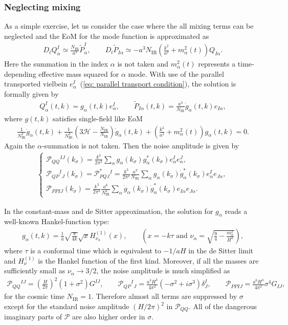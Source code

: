 \documentclass[a4paper,11pt]{article}
\newcommand{\IR}{\text{IR}}
\newcommand{\dps}{\displaystyle}
\newcommand{\calH}{\mathcal{H}}
\newcommand{\calP}{\mathcal{P}}
\newcommand{\bae}[1]{\begin{align} #1 \end{align}}
\newcommand{\bce}[1]{\begin{cases} #1 \end{cases}}
\begin{document}
\subsubsection{Neglecting mixing}

As a simple exercise, let us consider the case where the all mixing terms can be neglected and the EoM for the mode function is approximated as
\bae{
	D_tQ^I_\alpha\simeq\frac{N_\IR}{a^3}\tilde{P}^I_\alpha, \quad\quad 
	D_t\tilde{P}_{I\alpha}\simeq-a^3N_\IR\left(\frac{k^2}{a^2}+m_\alpha^2(t)\right)Q_{I\alpha}.
}
Here the summation in the index $\alpha$ is not taken and $m_\alpha^2(t)$ represents a time-depending effective mass squared 
for $\alpha$ mode. With use of the parallel transported vielbein $e^I_\alpha$~(\ref{eq: parallel transport condition}), 
the solution is formally given by
\bae{
	Q^I_\alpha(t,k)=g_\alpha(t,k)e^I_\alpha, \quad\quad \tilde{P}_{I\alpha}(t,k)=\frac{a^3}{N_\IR}\dot{g}_\alpha(t,k)e_{I\alpha},
}
where $g(t,k)$ satisfies single-field like EoM
\bae{
	\frac{1}{N_\IR^2}\ddot{g}_\alpha(t,k)+\frac{1}{N_\IR^2}\left(3\calH-\frac{\dot{N}_\IR}{N_\IR}\right)\dot{g}_\alpha(t,k)
	+\left(\frac{k^2}{a^2}+m^2_\alpha(t)\right)g_\alpha(t,k)=0.
}
Again the $\alpha$-summation is not taken. Then the noise amplitude is given by
\bae{
	\bce{
		\dps
		\calP_{QQ}{}^{IJ}(k_\sigma)=\frac{k^3}{2\pi^2}\sum_\alpha g_\alpha(k_\sigma)g^*_\alpha(k_\sigma)e^I_\alpha e^J_\alpha, \\[10pt]
		\dps
		\calP_{QP}{}^I{}_J(k_\sigma)=\calP^*_{PQJ}{}^I=\frac{k^3}{2\pi^2}\frac{a^3}{N_\IR}\sum_\alpha g_\alpha(k_\sigma)\dot{g}^*_\alpha(k_\sigma)e^I_\alpha e_{J\alpha}, \\[10pt]
		\dps
		\calP_{PPIJ}(k_\sigma)=\frac{k^3}{2\pi^2}\frac{a^6}{N_\IR^2}\sum_\alpha\dot{g}_\alpha(k_\sigma)\dot{g}^*_\alpha(k_\sigma)e_{I\alpha}e_{J\alpha}.
	}
}

In the constant-mass and de Sitter approximation, the solution for $g_\alpha$ reads a well-known Hankel-function type:
\bae{
	g_\alpha(t,k)=\frac{1}{a}\sqrt{\frac{\pi}{4k}}\sqrt{x}H_{\nu_\alpha}^{(1)}(x), \quad\quad 
	\left(x=-k\tau \text{ and } \nu_\alpha=\sqrt{\frac{9}{4}-\frac{m_\alpha^2}{H^2}}\right),
}
where $\tau$ is a conformal time which is equivalent to $-1/aH$ in the de Sitter limit and $H_\nu^{(1)}$ is the Hankel function of the first kind.
Moreover, if all the masses are sufficiently small as $\nu_\alpha\to3/2$, the noise amplitude is much simplified as
\bae{
	\calP_{QQ}{}^{IJ}=\left(\frac{H}{2\pi}\right)^2(1+\sigma^2)G^{IJ}, \quad\quad \calP_{QP}{}^I{}_J=\frac{a^3H^3}{4\pi^2}(-\sigma^2+i\sigma^3)\delta^I_J,
	\quad\quad \calP_{PPIJ}=\frac{a^6H^4}{4\pi^2}\sigma^4G_{IJ},
}
for the cosmic time $N_\IR=1$.
Therefore almost all terms are suppressed by $\sigma$ except for the standard noise amplitude $(H/2\pi)^2$ in $\calP_{QQ}$.
All of the dangerous imaginary parts of $\calP$ are also higher order in $\sigma$.
\end{document}
